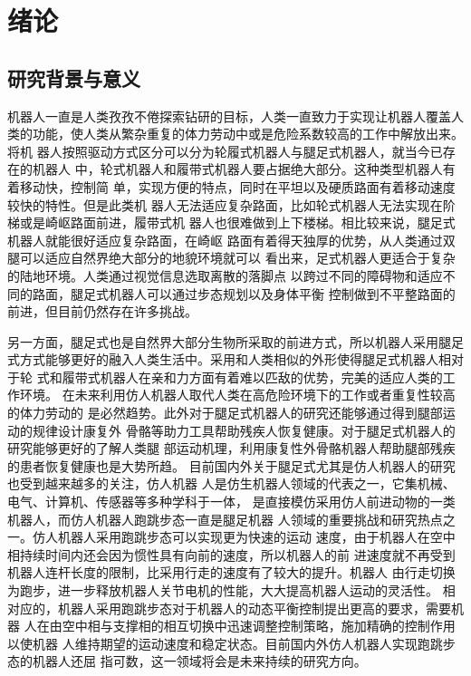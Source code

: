 \newcommand{\aref}[1]{\autoref{#1}\space}
\renewcommand{\algorithmcfname}{算法}
\chapter{绪论}
\section{研究背景与意义}
机器人一直是人类孜孜不倦探索钻研的目标，人类一直致力于实现让机器人覆盖人
类的功能，使人类从繁杂重复的体力劳动中或是危险系数较高的工作中解放出来。将机
器人按照驱动方式区分可以分为轮履式机器人与腿足式机器人，就当今已存在的机器人
中，轮式机器人和履带式机器人要占据绝大部分。这种类型机器人有着移动快，控制简
单，实现方便的特点，同时在平坦以及硬质路面有着移动速度较快的特性。但是此类机
器人无法适应复杂路面，比如轮式机器人无法实现在阶梯或是崎岖路面前进，履带式机
器人也很难做到上下楼梯。相比较来说，腿足式机器人就能很好适应复杂路面，在崎岖
路面有着得天独厚的优势，从人类通过双腿可以适应自然界绝大部分的地貌环境就可以
看出来，足式机器人更适合于复杂的陆地环境\cite{Schraft2000ServiceR}。人类通过视觉信息选取离散的落脚点
以跨过不同的障碍物和适应不同的路面，腿足式机器人可以通过步态规划以及身体平衡
控制做到不平整路面的前进，但目前仍然存在许多挑战。

另一方面，腿足式也是自然界大部分生物所采取的前进方式，所以机器人采用腿足
式方式能够更好的融入人类生活中。采用和人类相似的外形使得腿足式机器人相对于轮
式和履带式机器人在亲和力方面有着难以匹敌的优势，完美的适应人类的工作环境\cite{2010067776.nh}。
在未来利用仿人机器人取代人类在高危险环境下的工作或者重复性较高的体力劳动的
是必然趋势。此外对于腿足式机器人的研究还能够通过得到腿部运动的规律设计康复外
骨骼等助力工具帮助残疾人恢复健康。对于腿足式机器人的研究能够更好的了解人类腿
部运动机理，利用康复性外骨骼机器人帮助腿部残疾的患者恢复健康也是大势所趋。
目前国内外关于腿足式尤其是仿人机器人的研究也受到越来越多的关注，仿人机器
人是仿生机器人领域的代表之一，它集机械、电气、计算机、传感器等多种学科于一体，
是直接模仿采用仿人前进动物的一类机器人\cite{梶田秀司2007仿人机器人}，而仿人机器人跑跳步态一直是腿足机器
人领域的重要挑战和研究热点之一。仿人机器人采用跑跳步态可以实现更为快速的运动
速度，由于机器人在空中相持续时间内还会因为惯性具有向前的速度，所以机器人的前
进速度就不再受到机器人连杆长度的限制，比采用行走的速度有了较大的提升。机器人
由行走切换为跑步，进一步释放机器人关节电机的性能，大大提高机器人运动的灵活性。
相对应的，机器人采用跑跳步态对于机器人的动态平衡控制提出更高的要求，需要机器
人在由空中相与支撑相的相互切换中迅速调整控制策略，施加精确的控制作用以使机器
人维持期望的运动速度和稳定状态。目前国内外仿人机器人实现跑跳步态的机器人还屈
指可数，这一领域将会是未来持续的研究方向。

